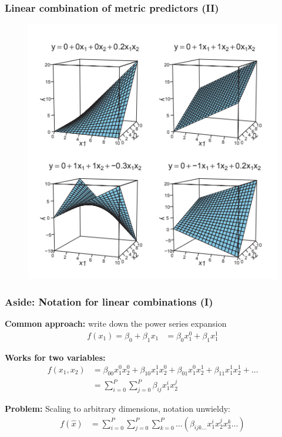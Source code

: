 \documentclass[usenames,dvipsnames,table]{beamer}
\begin{document}
\begin{frame}
\frametitle{Linear combination of metric predictors (II)}
\begin{figure}
\centering
\includegraphics[height=.8\textheight]{img/fig15_3}
\end{figure}
\end{frame}


\begin{frame}
\frametitle{Aside: Notation for linear combinations (I)}
\textbf{Common approach:} write down the power series expansion
\begin{align*}
f(x_1) = \beta_0 + \beta_1 x_1 &= \beta_0 x_1^0 + \beta_1 x_1^1
\end{align*}

\textbf{Works for two variables:}
\begin{align*}
f(x_1, x_2) &= \beta_{00} x_1^0 x_2^0 + \beta_{10} x_1^1 x_2^0 + \beta_{01} x_1^0 x_2^1 + \beta_{11} x_1^1 x_2^1 + \ldots \\
            &= \sum_{i=0}^P \sum_{j=0}^P \beta_{ij} x_1^i x_2^j
\end{align*}

\textbf{Problem:} Scaling to arbitrary dimensions, notation unwieldy:
\begin{align*}
f(\widehat{x}) &= \sum_{i=0}^P \sum_{j=0}^P \sum_{k=0}^P \ldots \left( \beta_{ijk\ldots} x_1^i x_2^j x_3^k\ldots \right)
\end{align*}
\end{frame}
\end{document}
